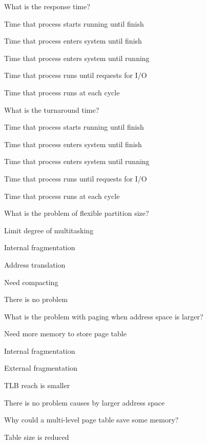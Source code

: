 \begin{questions}\setlength{\itemsep}{0.08cm}\setcounter{question}{29}
\question What is the response time?
\begin{verticalchoices}
\item Time that process starts running until finish
\item Time that process enters system until finish
\item Time that process enters system until running
\item Time that process runs until requests for I/O
\item Time that process runs at each cycle
\end{verticalchoices}
\question What is the turnaround time?
\begin{verticalchoices}
\item Time that process starts running until finish
\item Time that process enters system until finish
\item Time that process enters system until running
\item Time that process runs until requests for I/O
\item Time that process runs at each cycle
\end{verticalchoices}
\question What is the problem of flexible partition size?
\begin{verticalchoices}
\item Limit degree of multitasking
\item Internal fragmentation
\item Address translation
\item Need compacting
\item There is no problem
\end{verticalchoices}
\question What is the problem with paging when address space is larger?
\begin{verticalchoices}
\item Need more memory to store page table
\item Internal fragmentation
\item External fragmentation
\item TLB reach is smaller
\item There is no problem causes by larger address space
\end{verticalchoices}
\question Why could a multi-level page table save some memory?
\begin{verticalchoices}
\item Table size is reduced

\end{verticalchoices}
\end{questions}
